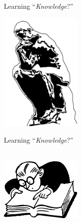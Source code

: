 
\def\title{Learning ``\textit{Knowledge}?''}
\begin{frame}{\title}
\begin{center}
\includegraphics[width=4cm]{../img/philosopher.png}
\end{center}
\end{frame}




\begin{frame}[noframenumbering]{\title}
\begin{center}
 \\
\vspace{5ex}
\includegraphics[width=4cm]{../img/facts.png}
\end{center}
\end{frame}




